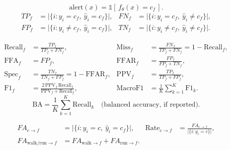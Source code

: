
\begin{equation}\label{eq:fall-binary}
  \text{alert}(x)=\mathbb{1}[\,f_\theta(x)=c_f\,].
\end{equation}
\begin{align}
  TP_f &= \lvert\{i: y_i=c_f,\ \hat{y}_i=c_f\}\rvert, &
  FN_f &= \lvert\{i: y_i=c_f,\ \hat{y}_i\neq c_f\}\rvert, \label{eq:tpfn}\\
  FP_f &= \lvert\{i: y_i\neq c_f,\ \hat{y}_i=c_f\}\rvert, &
  TN_f &= \lvert\{i: y_i\neq c_f,\ \hat{y}_i\neq c_f\}\rvert. \label{eq:fptn}
\end{align}

\begin{align}
  \mathrm{Recall}_f &= \frac{TP_f}{TP_f+FN_f}, &
  \mathrm{Miss}_f &= \frac{FN_f}{TP_f+FN_f}=1-\mathrm{Recall}_f, \label{eq:recall-miss}\\
  \mathrm{FFA}_f &= FP_f, &
  \mathrm{FFAR}_f &= \frac{FP_f}{FP_f+TN_f}, \label{eq:ffa}\\
  \mathrm{Spec}_f &= \frac{TN_f}{TN_f+FP_f}=1-\mathrm{FFAR}_f, &
  \mathrm{PPV}_f &= \frac{TP_f}{TP_f+FP_f}, \label{eq:spec-ppv}\\
  \mathrm{F1}_f &= \frac{2\,\mathrm{PPV}_f\,\mathrm{Recall}_f}{\mathrm{PPV}_f+\mathrm{Recall}_f}, &
  \mathrm{MacroF1} &= \frac{1}{K}\sum_{k=1}^{K}\mathrm{F1}_k. \label{eq:f1-macro}
\end{align}
\begin{equation}\label{eq:balanced-acc}
  \mathrm{BA} = \frac{1}{K}\sum_{k=1}^{K}\mathrm{Recall}_k \quad\text{(balanced accuracy, if reported).}
\end{equation}

\begin{align}
  FA_{c\to f} &= \lvert\{i: y_i=c,\ \hat{y}_i=c_f\}\rvert, &
  \mathrm{Rate}_{c\to f} &= \frac{FA_{c\to f}}{\lvert\{i: y_i=c\}\rvert}, \label{eq:class-fa}\\
  FA_{\mathrm{walk/run}\to f} &= FA_{\mathrm{walk}\to f}+FA_{\mathrm{run}\to f}. &&  \label{eq:motion-fa}
\end{align}

